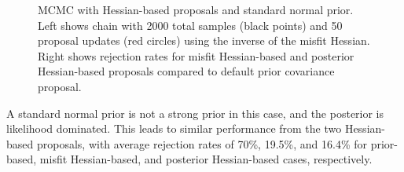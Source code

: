 \begin{figure}[htbp]
  \begin{subfigmatrix}{2}
  \end{subfigmatrix}
  \caption{MCMC with Hessian-based proposals and standard normal prior. Left shows chain with 2000 total samples (black points) and 50 proposal updates (red circles) using the inverse of the misfit Hessian. Right shows rejection rates for misfit Hessian-based and posterior Hessian-based proposals compared to default prior covariance proposal.}
\label{fig:rosen_restart}
\end{figure}
A standard normal prior is not a strong prior in this case, and the
posterior is likelihood dominated.  This leads to similar performance
from the two Hessian-based proposals, with average rejection rates of
70\%, 19.5\%, and 16.4\% for prior-based, misfit Hessian-based, and
posterior Hessian-based cases, respectively.

